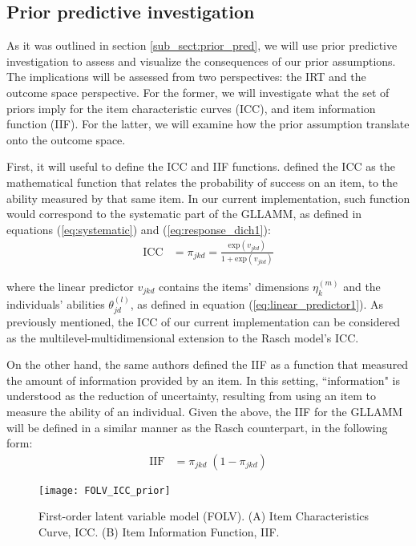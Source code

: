 
\subsection{Prior predictive investigation} \label{sub_sect:prior_pred_inv}

As it was outlined in section \ref{sub_sect:prior_pred}, we will use prior predictive investigation to assess and visualize the consequences of our prior assumptions. The implications will be assessed from two perspectives: the IRT and the outcome space perspective. For the former, we will investigate what the set of priors imply for the item characteristic curves (ICC), and item information function (IIF). For the latter, we will examine how the prior assumption translate onto the outcome space.

First, it will useful to define the ICC and IIF functions. \citet{Hambleton_et_al_1991b} defined the ICC as the mathematical function that relates the probability of success on an item, to the ability measured by that same item. In our current implementation, such function would correspond to the systematic part of the GLLAMM, as defined in equations (\ref{eq:systematic}) and (\ref{eq:response_dich1}):
%
\begin{equation} \label{eq:ICC}
	\begin{split}
		\text{ICC} &= \pi_{jkd} = \frac{ \text{exp}(v_{jkd}) }{ 1 + \text{exp}(v_{jkd}) }
	\end{split}	
\end{equation}

\noindent where the linear predictor $v_{jkd}$ contains the items' dimensions $\eta^{(m)}_{k}$ and the individuals' abilities $\theta^{(l)}_{jd}$, as defined in equation (\ref{eq:linear_predictor1}). As previously mentioned, the ICC of our current implementation can be considered as the multilevel-multidimensional extension to the Rasch model's ICC.

On the other hand, the same authors defined the IIF as a function that measured the amount of information provided by an item. In this setting, ``information" is understood as the reduction of uncertainty, resulting from using an item to measure the ability of an individual. Given the above, the IIF for the GLLAMM will be defined in a similar manner as the Rasch counterpart, in the following form:
%
\begin{equation} \label{eq:IIF}
	\begin{split}
		\text{IIF} &= \pi_{jkd} \; (1 - \pi_{jkd})
	\end{split}	
\end{equation}
%
\begin{figure}[H]
	\centering
	\texttt{[image: FOLV\_ICC\_prior]}
	\caption[First-order latent variable model (FOLV). Item Characteristic Curve (ICC) and Item Information Function (IIF).]%
	{First-order latent variable model (FOLV). (A) Item Characteristics Curve, ICC. (B) Item Information Function, IIF.}
	\label{fig:FOLV_ICC_prior}
\end{figure}

